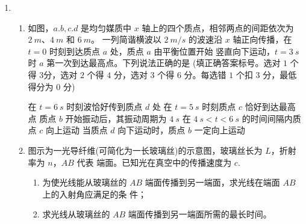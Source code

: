 \begin{enumerate}
\item 
{}
\begin{enumerate}
	\item
如图，$ a.b,c.d $ 是均匀媒质中 $ x $ 轴上的四个质点，相邻两点的间距依次为 $ 2 \ m $、$ 4 \ m $ 和 $ 6 \ m $。
一列简谐横波以 $ 2 \ m /s $ 的波速沿 $ x $ 轴正向传播，在 $ t=0 $ 时刻到达质点 $ a $ 处，质点 $ a $ 由平衡位置开始
竖直向下运动，$ t=3 \ s $ 时 $ a $ 第一次到达最高点。下列说法正确的是
 \underlinegap 
(填正确答案标号。选对 $ 1 $ 个得
$ 3 $分，选对 $ 2 $ 个得 $ 4 $ 分，选对 $ 3 $ 个得 $ 6 $ 分。每选错 $ 1 $ 个扣 $ 3 $ 分，最低得分为 $ 0 $ 分)
\begin{figure}[h!]
	\centering
	
\end{figure}

\fivechoices
{在 $ t=6 \ s $ 时刻波恰好传到质点 $ d $ 处}
{在 $ t=5 \ s $ 时刻质点 $ c $ 恰好到达最高点}
{质点 $ b $ 开始振动后，其振动周期为 $ 4 \ s $}
{在 $ 4 \ s <t<6 \ s $ 的时间间隔内质点 $ c $ 向上运动}
{当质点 $ d $ 向下运动时，质点 $ b $ 一定向上运动}



\item 
图示为一光导纤维(可简化为一长玻璃丝)的示意图，玻璃丝长为 $ L $，折射率为 $ n $，$ AB $ 代表
端面。已知光在真空中的传播速度为 $ c $.
\begin{enumerate}
	\item
为使光线能从玻璃丝的 $ AB $ 端面传播到另一端面，求光线在端面 $ AB $ 上的入射角应满足的条
件；
\item 
求光线从玻璃丝的 $ AB $ 端面传播到另一端面所需的最长时间。
\end{enumerate}
\begin{figure}[h!]
	\flushright
	
\end{figure}





\end{enumerate}
\end{enumerate}
